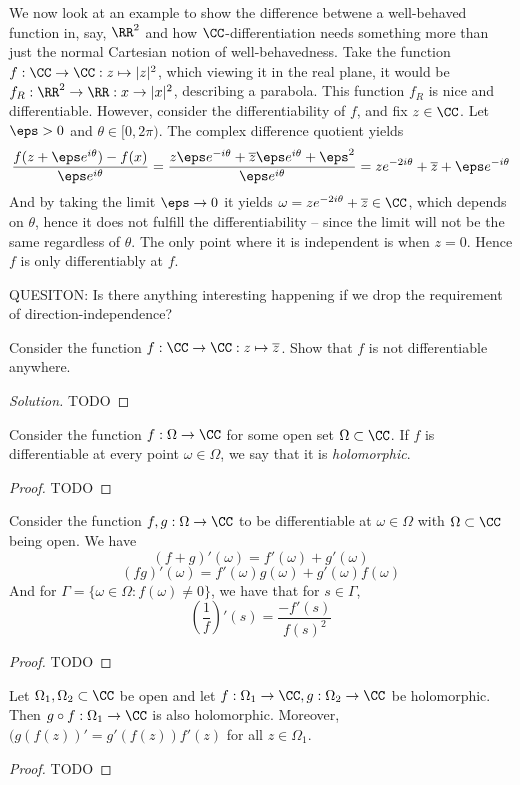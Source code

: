 \begin{example}
  We now look at an example to show the difference betwene a well-behaved
  function in, say, $\RR^2$ and how $\CC$-differentiation needs something more
  than just the normal Cartesian notion of well-behavedness. Take the function
  $f:\CC\to\CC:z\mapsto|z|^2$, which viewing it in the real plane, it would be
  $f_R:\RR^2\to\RR:x\to |x|^2$, describing a parabola. This function $f_R$ is
  nice and differentiable. However, consider the differentiability of $f$, and
  fix $z\in\CC$. Let $\eps>0$ and $\theta\in[0,2\pi)$. The complex difference
  quotient yields
  \[\frac{f(z+\eps e^{i\theta}) - f(x)}{\eps e^{i\theta}} =
  \frac{z\eps e^{-i\theta} + \overline{z}\eps e^{i\theta }+ \eps^2}{\eps
  e^{i\theta}} = ze^{-2i\theta} + \overline{z} + \eps e^{-i\theta}\]
  And by taking the limit $\eps\to 0$ it yields $\omega =
  ze^{-2i\theta}+\overline{z}\in\CC$, which depends on $\theta$, hence it does
  not fulfill the differentiability -- since the limit will not be the same
  regardless of $\theta$. The only point where it is independent is when $z=0$.
  Hence $f$ is only differentiably at $f$.
\end{example}
QUESITON: Is there anything interesting happening if we drop the requirement of
direction-independence?
\begin{exercise}
  Consider the function $f:\CC\to\CC: z\mapsto\overline{z}$. Show that $f$ is
  not differentiable anywhere.
\end{exercise}
\begin{proof}[Solution]
  TODO
\end{proof}

\begin{lemma}
  Consider the function $f:\Omega\to\CC$ for some open set $\Omega\subset\CC$.
  If $f$ is differentiable at every point $\omega\in\Omega$, we say that it is
  \emph{holomorphic}.
  \label{def:holomorphicFun}
\end{lemma}
\begin{proof}
  TODO
\end{proof}

\begin{lemma}
  Consider the function $f,g:\Omega\to\CC$ to be differentiable at
  $\omega\in\Omega$ with $\Omega\subset\CC$ being open. We have 
  \[(f+g)'(\omega) = f'(\omega)+g'(\omega)\]
  \[(fg)'(\omega) = f'(\omega)g(\omega) + g'(\omega)f(\omega)\]
  And for $\Gamma=\{\omega\in\Omega : f(\omega)\neq 0\}$, we have that for $s\in
  \Gamma$,
  \[\left( \frac{1}{f} \right)'(s) = \frac{-f'(s)}{f(s)^2}\]
  \label{lem:diffRules}
\end{lemma}
\begin{proof}
  TODO
\end{proof}

\begin{lemma}
  Let $\Omega_1,\Omega_2\subset\CC$ be open and let $f:\Omega_1\to\CC,
  g:\Omega_2\to\CC$ be holomorphic. Then $g\circ f:\Omega_1\to\CC$ is also
  holomorphic. Moreover, $(g(f(z))'= g'(f(z))f'(z)$ for all $z\in\Omega_1$.
  \label{lem:chainrule}
\end{lemma}
\begin{proof}
  TODO
\end{proof}
